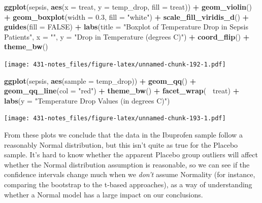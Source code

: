 \documentclass[
]{book}
\newenvironment{Shaded}{\begin{snugshade}}{\end{snugshade}}
\newcommand{\DataTypeTok}[1]{\textcolor[rgb]{0.13,0.29,0.53}{#1}}
\newcommand{\FloatTok}[1]{\textcolor[rgb]{0.00,0.00,0.81}{#1}}
\newcommand{\KeywordTok}[1]{\textcolor[rgb]{0.13,0.29,0.53}{\textbf{#1}}}
\newcommand{\NormalTok}[1]{#1}
\newcommand{\OperatorTok}[1]{\textcolor[rgb]{0.81,0.36,0.00}{\textbf{#1}}}
\newcommand{\OtherTok}[1]{\textcolor[rgb]{0.56,0.35,0.01}{#1}}
\newcommand{\StringTok}[1]{\textcolor[rgb]{0.31,0.60,0.02}{#1}}
\begin{document}
\begin{Shaded}
\begin{Highlighting}[]
\KeywordTok{ggplot}\NormalTok{(sepsis, }\KeywordTok{aes}\NormalTok{(}\DataTypeTok{x =}\NormalTok{ treat, }\DataTypeTok{y =}\NormalTok{ temp_drop, }\DataTypeTok{fill =}\NormalTok{ treat)) }\OperatorTok{+}
\StringTok{    }\KeywordTok{geom_violin}\NormalTok{() }\OperatorTok{+}
\StringTok{    }\KeywordTok{geom_boxplot}\NormalTok{(}\DataTypeTok{width =} \FloatTok{0.3}\NormalTok{, }\DataTypeTok{fill =} \StringTok{"white"}\NormalTok{) }\OperatorTok{+}
\StringTok{    }\KeywordTok{scale_fill_viridis_d}\NormalTok{() }\OperatorTok{+}
\StringTok{    }\KeywordTok{guides}\NormalTok{(}\DataTypeTok{fill =} \OtherTok{FALSE}\NormalTok{) }\OperatorTok{+}\StringTok{ }
\StringTok{    }\KeywordTok{labs}\NormalTok{(}\DataTypeTok{title =} \StringTok{"Boxplot of Temperature Drop in Sepsis Patients"}\NormalTok{,}
         \DataTypeTok{x =} \StringTok{""}\NormalTok{, }\DataTypeTok{y =} \StringTok{"Drop in Temperature (degrees C)"}\NormalTok{) }\OperatorTok{+}\StringTok{ }
\StringTok{    }\KeywordTok{coord_flip}\NormalTok{() }\OperatorTok{+}
\StringTok{    }\KeywordTok{theme_bw}\NormalTok{()}
\end{Highlighting}
\end{Shaded}

\texttt{[image: 431-notes\_files/figure-latex/unnamed-chunk-192-1.pdf]}

\begin{Shaded}
\begin{Highlighting}[]
\KeywordTok{ggplot}\NormalTok{(sepsis, }\KeywordTok{aes}\NormalTok{(}\DataTypeTok{sample =}\NormalTok{ temp_drop)) }\OperatorTok{+}
\StringTok{    }\KeywordTok{geom_qq}\NormalTok{() }\OperatorTok{+}\StringTok{ }\KeywordTok{geom_qq_line}\NormalTok{(}\DataTypeTok{col =} \StringTok{"red"}\NormalTok{) }\OperatorTok{+}
\StringTok{    }\KeywordTok{theme_bw}\NormalTok{() }\OperatorTok{+}
\StringTok{    }\KeywordTok{facet_wrap}\NormalTok{(}\OperatorTok{~}\StringTok{ }\NormalTok{treat) }\OperatorTok{+}\StringTok{ }
\StringTok{    }\KeywordTok{labs}\NormalTok{(}\DataTypeTok{y =} \StringTok{"Temperature Drop Values (in degrees C)"}\NormalTok{)}
\end{Highlighting}
\end{Shaded}

\texttt{[image: 431-notes\_files/figure-latex/unnamed-chunk-193-1.pdf]}

From these plots we conclude that the data in the Ibuprofen sample follow a reasonably Normal distribution, but this isn't quite as true for the Placebo sample. It's hard to know whether the apparent Placebo group outliers will affect whether the Normal distribution assumption is reasonable, so we can see if the confidence intervals change much when we \emph{don't} assume Normality (for instance, comparing the bootstrap to the t-based approaches), as a way of understanding whether a Normal model has a large impact on our conclusions.
\end{document}
